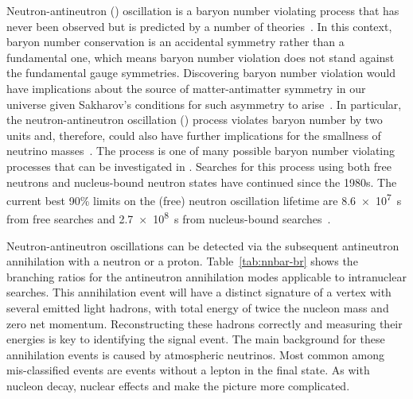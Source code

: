 Neutron-antineutron (\nnbar) oscillation is a baryon number violating process that
has never been observed but is predicted by a number of  theories~\cite{Phillips:2014fgb}. In this context, baryon number conservation is an accidental
symmetry rather than a fundamental one, which means baryon number violation
does not stand against the fundamental gauge symmetries. Discovering baryon
number violation would have implications about the source of matter-antimatter
symmetry in our universe given Sakharov's conditions for such asymmetry to arise~\cite{Sakharov:1967dj}.
In particular, the neutron-antineutron oscillation (\nnbar) process violates
baryon number by two units and, therefore, could also have further implications for
the smallness of neutrino masses~\cite{Phillips:2014fgb}. The \nnbar process is one of many possible baryon number violating processes that can be investigated in . Searches for this process using
both free neutrons and nucleus-bound neutron states have continued 
since the 1980s. The current best \num{90}\%  limits on the (free) neutron oscillation lifetime are \SI{8.6e7}{\s} from free \nnbar searches and \SI{2.7e8}{\s} from nucleus-bound \nnbar searches~\cite{BaldoCeolin:1994jz,Abe:2011ky}.

Neutron-antineutron oscillations can be detected via the subsequent antineutron annihilation with a neutron or a proton. Table~\ref{tab:nnbar-br} shows the branching ratios for the antineutron annihilation modes applicable to intranuclear searches.  This annihilation event will have a distinct signature of a vertex with several emitted light hadrons, with total energy of twice the nucleon mass and zero net momentum. Reconstructing these hadrons correctly and measuring their energies is key to identifying the signal event. The main background for these \nnbar annihilation events is caused by atmospheric neutrinos. Most common among mis-classified events are   events without a lepton in the final state. As with nucleon decay, nuclear effects and  make the picture more complicated.


